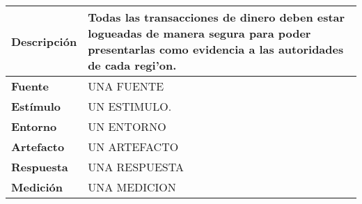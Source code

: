 \begin{center}
  \begin{tabular}{| l | p{10cm} | }
    \hline
  \textbf{Descripción} & Todas las transacciones de dinero deben estar logueadas de manera segura para poder presentarlas como evidencia a las autoridades de cada regi'on.\\  \hline
  \textbf{Fuente} & UNA FUENTE\\  \hline
  \textbf{Estímulo} & UN ESTIMULO.\\  \hline
  \textbf{Entorno} & UN ENTORNO\\  \hline
  \textbf{Artefacto} & UN ARTEFACTO\\  \hline
  \textbf{Respuesta} & UNA RESPUESTA\\  \hline
  \textbf{Medición} & UNA MEDICION\\  \hline
  \end{tabular}
\end{center} 
